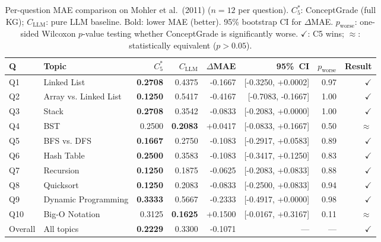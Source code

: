 \begin{table}[ht]\centering
\caption{Per-question MAE comparison on Mohler et al.\ (2011) ($n=12$ per question). $C_5^{*}$: ConceptGrade (full KG); $C_{\text{LLM}}$: pure LLM baseline. Bold: lower MAE (better). 95\% bootstrap CI for $\Delta$MAE. $p_{\text{worse}}$: one-sided Wilcoxon $p$-value testing whether ConceptGrade is significantly worse. $\checkmark$: C5 wins; $\approx$: statistically equivalent ($p>0.05$).}
\label{tab:per_question}
\begin{tabular}{@{}llrrrrrr@{}}\toprule
\textbf{Q} & \textbf{Topic} & $C_5^{*}$ & $C_{\text{LLM}}$ & $\Delta$MAE & 95\%~CI & $p_{\text{worse}}$ & \textbf{Result} \\\midrule
Q1 & Linked List & \textbf{0.2708} & 0.4375 & -0.1667 & [-0.3250, +0.0002] & 0.97 & $\checkmark$ \\
Q2 & Array vs. Linked List & \textbf{0.1250} & 0.5417 & -0.4167 & [-0.7083, -0.1667] & 1.00 & $\checkmark$ \\
Q3 & Stack & \textbf{0.2708} & 0.3542 & -0.0833 & [-0.2083, +0.0000] & 1.00 & $\checkmark$ \\
Q4 & BST & 0.2500 & \textbf{0.2083} & +0.0417 & [-0.0833, +0.1667] & 0.50 & $\approx$ \\
Q5 & BFS vs. DFS & \textbf{0.1667} & 0.2750 & -0.1083 & [-0.2917, +0.0583] & 0.89 & $\checkmark$ \\
Q6 & Hash Table & \textbf{0.2500} & 0.3583 & -0.1083 & [-0.3417, +0.1250] & 0.83 & $\checkmark$ \\
Q7 & Recursion & \textbf{0.1250} & 0.1875 & -0.0625 & [-0.2083, +0.0833] & 0.88 & $\checkmark$ \\
Q8 & Quicksort & \textbf{0.1250} & 0.2083 & -0.0833 & [-0.2500, +0.0833] & 0.94 & $\checkmark$ \\
Q9 & Dynamic Programming & \textbf{0.3333} & 0.5667 & -0.2333 & [-0.4917, +0.0000] & 0.98 & $\checkmark$ \\
Q10 & Big-O Notation & 0.3125 & \textbf{0.1625} & +0.1500 & [-0.0167, +0.3167] & 0.11 & $\approx$ \\
\midrule
Overall & All topics & \textbf{0.2229} & 0.3300 & -0.1071 & --- & --- & $\checkmark$ \\
\bottomrule
\end{tabular}
\end{table}